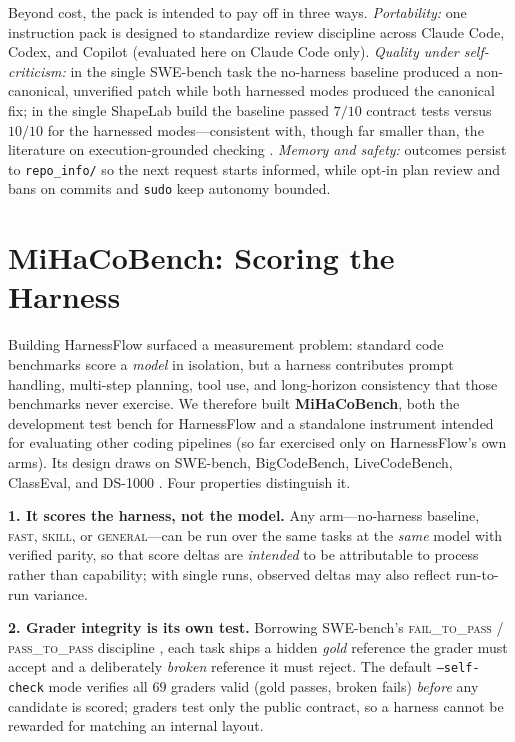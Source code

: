 \documentclass{article}
\begin{document}
Beyond cost, the pack is intended to pay off in three ways. \emph{Portability:}
one instruction pack is designed to standardize review discipline across Claude
Code, Codex, and Copilot (evaluated here on Claude Code only).
\emph{Quality under self-criticism:} in the single SWE-bench task the no-harness
baseline produced a non-canonical, unverified patch while both harnessed modes
produced the canonical fix; in the single ShapeLab build the baseline passed
$7/10$ contract tests versus $10/10$ for the harnessed modes---consistent with,
though far smaller than, the literature on execution-grounded checking
\citep{chen2023selfdebug}. \emph{Memory and safety:} outcomes persist to
\texttt{repo\_info/} so the next request starts informed, while opt-in plan
review and bans on commits and \texttt{sudo} keep autonomy bounded.

\section{MiHaCoBench: Scoring the Harness}
\label{sec:bench}

Building HarnessFlow surfaced a measurement problem: standard code benchmarks
\citep{chen2021codex,austin2021mbpp,jain2024livecodebench} score a \emph{model}
in isolation, but a harness contributes prompt handling, multi-step planning,
tool use, and long-horizon consistency that those benchmarks never exercise. We
therefore built \textbf{MiHaCoBench}, both the development test bench for
HarnessFlow and a standalone instrument intended for evaluating other coding
pipelines (so far exercised only on HarnessFlow's own arms). Its design draws on
SWE-bench, BigCodeBench, LiveCodeBench, ClassEval, and DS-1000
\citep{jimenez2024swebench,zhuo2024bigcodebench,jain2024livecodebench,du2023classeval,lai2023ds1000}.
Four properties distinguish it.

\textbf{1. It scores the harness, not the model.} Any arm---no-harness baseline,
\textsc{fast}, \textsc{skill}, or \textsc{general}---can be run over the same
tasks at the \emph{same} model with verified parity, so that score deltas are
\emph{intended} to be attributable to process rather than capability; with single
runs, observed deltas may also reflect run-to-run variance.

\textbf{2. Grader integrity is its own test.} Borrowing SWE-bench's
\textsc{fail\_to\_pass} / \textsc{pass\_to\_pass} discipline
\citep{jimenez2024swebench}, each task ships a hidden \emph{gold} reference the
grader must accept and a deliberately \emph{broken} reference it must reject. The
default \texttt{--self-check} mode verifies all $69$ graders valid (gold passes,
broken fails) \emph{before} any candidate is scored; graders test only the public
contract, so a harness cannot be rewarded for matching an internal layout.
\end{document}
